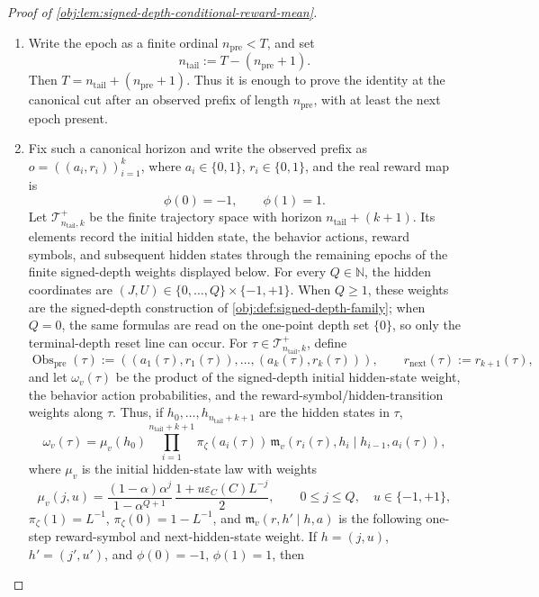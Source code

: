 \documentclass[11pt]{article}
\begin{document}
\begin{proof}[Proof of \cref{obj:lem:signed-depth-conditional-reward-mean}]
\begin{enumerate}
\item
Write the epoch as a finite ordinal \(n_{\mathrm{pre}}<T\), and set
\[
n_{\mathrm{tail}}:=T-(n_{\mathrm{pre}}+1).
\]
Then \(T=n_{\mathrm{tail}}+(n_{\mathrm{pre}}+1)\). Thus it is enough to prove the identity at the canonical cut after an observed prefix of length \(n_{\mathrm{pre}}\), with at least the next epoch present. %

\item
Fix such a canonical horizon and write the observed prefix as
\(o=((a_i,r_i))_{i=1}^k\), where \(a_i\in\{0,1\}\), \(r_i\in\{0,1\}\), and the real reward map is
\[
\phi(0)=-1,
\qquad
\phi(1)=1.
\]
Let \(\mathcal T^+_{n_{\mathrm{tail}},k}\) be the finite trajectory space with horizon \(n_{\mathrm{tail}}+(k+1)\). Its elements record the initial hidden state, the behavior actions, reward symbols, and subsequent hidden states through the remaining epochs of the finite signed-depth weights displayed below. For every \(Q\in\mathbb N\), the hidden coordinates are \((J,U)\in\{0,\ldots,Q\}\times\{-1,+1\}\). When \(Q\ge 1\), these weights are the signed-depth construction of \cref{obj:def:signed-depth-family}; when \(Q=0\), the same formulas are read on the one-point depth set \(\{0\}\), so only the terminal-depth reset line can occur. For \(\tau\in\mathcal T^+_{n_{\mathrm{tail}},k}\), define
\[
\operatorname{Obs}_{\mathrm{pre}}(\tau)
:=((a_1(\tau),r_1(\tau)),\ldots,(a_k(\tau),r_k(\tau))),
\qquad
r_{\mathrm{next}}(\tau):=r_{k+1}(\tau),
\]
and let \(\omega_v(\tau)\) be the product of the signed-depth initial hidden-state weight, the behavior action probabilities, and the reward-symbol/hidden-transition weights along \(\tau\). Thus, if \(h_0,\ldots,h_{n_{\mathrm{tail}}+k+1}\) are the hidden states in \(\tau\),
\[
\omega_v(\tau)
=
\mu_v(h_0)
\prod_{i=1}^{n_{\mathrm{tail}}+k+1}
\pi_\zeta(a_i(\tau))\,
\mathfrak m_v(r_i(\tau),h_i\mid h_{i-1},a_i(\tau)),
\]
where \(\mu_v\) is the initial hidden-state law with weights
\[
\mu_v(j,u)
=
\frac{(1-\alpha)\alpha^j}{1-\alpha^{Q+1}}\,
\frac{1+u\varepsilon_C(C)L^{-j}}{2},
\qquad 0\le j\le Q,
\quad u\in\{-1,+1\},
\]
\(\pi_\zeta(1)=L^{-1}\), \(\pi_\zeta(0)=1-L^{-1}\), and \(\mathfrak m_v(r,h'\mid h,a)\) is the following one-step reward-symbol and next-hidden-state weight. If \(h=(j,u)\), \(h'=(j',u')\), and \(\phi(0)=-1\), \(\phi(1)=1\), then

\end{enumerate}
\end{proof}
\end{document}
